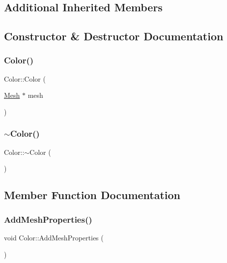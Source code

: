 \subsection*{Additional Inherited Members}


\subsection{Constructor \& Destructor Documentation}
\mbox{\label{class_color_a03838d592fc4c05285792631fc2b8e24}} 
\subsubsection{\texorpdfstring{Color()}{Color()}}
{\footnotesize\ttfamily Color\+::\+Color (\begin{DoxyParamCaption}\item[{\mbox{\hyperlink{class_mesh}{Mesh}} $\ast$}]{mesh }\end{DoxyParamCaption})}

\mbox{\label{class_color_a3cfce6c6821d3bf489e26074c55378c0}} 
\subsubsection{\texorpdfstring{$\sim$Color()}{~Color()}}
{\footnotesize\ttfamily Color\+::$\sim$\+Color (\begin{DoxyParamCaption}{ }\end{DoxyParamCaption})}



\subsection{Member Function Documentation}
\mbox{\label{class_color_abd3f6be3b5babb28bf1a13c89219bd4b}} 
\subsubsection{\texorpdfstring{AddMeshProperties()}{AddMeshProperties()}}
{\footnotesize\ttfamily void Color\+::\+Add\+Mesh\+Properties (\begin{DoxyParamCaption}{ }\end{DoxyParamCaption})\hspace{0.3cm}{\ttfamily [virtual]}}



